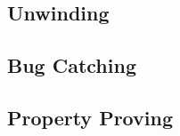 
\subsection{Unwinding}
\label{subsection:unwinding}


\subsection{Bug Catching}
\label{subsection:bug-catching}


\subsection{Property Proving}
\label{subsection:property-proving}
